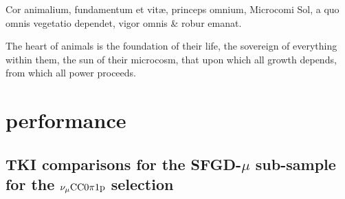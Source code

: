  \begin{savequote}[8cm]
\textlatin{Cor animalium, fundamentum e\longs t vitæ, princeps omnium, Microco\longs mi Sol, a quo omnis vegetatio dependet, vigor omnis \& robur emanat.}

The heart of animals is the foundation of their life, the sovereign of everything within them, the sun of their microcosm, that upon which all growth depends, from which all power proceeds.
\end{savequote}

\chapter{\label{app:perf}performance}

\minitoc

\section{TKI comparisons for the SFGD-$\mu$ sub-sample for the $\nu_{\mu}\textrm{CC}0\pi1\textrm{p}$ selection}
\label{sec:app-tki-sfgd-mu}

